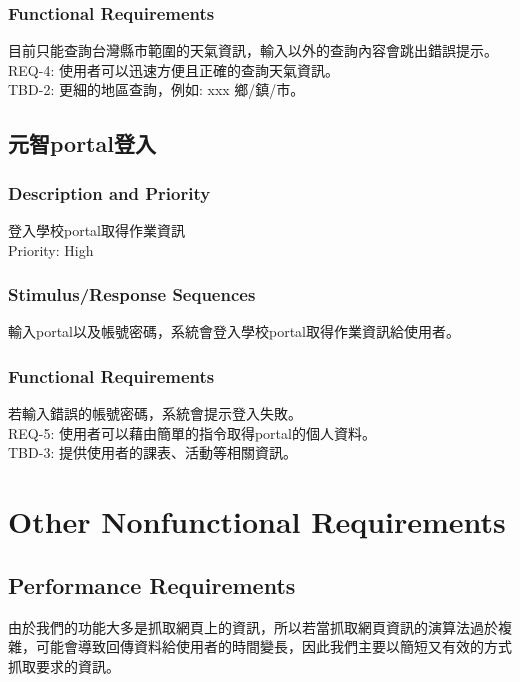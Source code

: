 \documentclass{scrreprt}
\begin{document}
\begin{CJK}{UTF8}{bkai}
\subsection{Functional Requirements}
目前只能查詢台灣縣市範圍的天氣資訊，輸入以外的查詢內容會跳出錯誤提示。\\
REQ-4: 使用者可以迅速方便且正確的查詢天氣資訊。\\
TBD-2: 更細的地區查詢，例如: xxx 鄉/鎮/市。\\

\section{元智portal登入}

\subsection{Description and Priority}
登入學校portal取得作業資訊\\
Priority: High\\

\subsection{Stimulus/Response Sequences}
輸入portal以及帳號密碼，系統會登入學校portal取得作業資訊給使用者。\\

\subsection{Functional Requirements}
若輸入錯誤的帳號密碼，系統會提示登入失敗。\\
REQ-5: 使用者可以藉由簡單的指令取得portal的個人資料。\\
TBD-3: 提供使用者的課表、活動等相關資訊。\\

\chapter{Other Nonfunctional Requirements}

\section{Performance Requirements}
由於我們的功能大多是抓取網頁上的資訊，所以若當抓取網頁資訊的演算法過於複雜，可能會導致回傳資料給使用者的時間變長，因此我們主要以簡短又有效的方式抓取要求的資訊。


\end{CJK}
\end{document}
